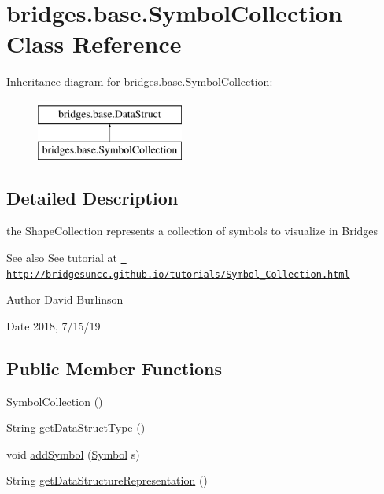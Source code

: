 \hypertarget{classbridges_1_1base_1_1_symbol_collection}{}\section{bridges.\+base.\+Symbol\+Collection Class Reference}
\label{classbridges_1_1base_1_1_symbol_collection}
Inheritance diagram for bridges.\+base.\+Symbol\+Collection\+:\begin{figure}[H]
\begin{center}
\leavevmode
\includegraphics[height=2.000000cm]{classbridges_1_1base_1_1_symbol_collection}
\end{center}
\end{figure}


\subsection{Detailed Description}
the Shape\+Collection represents a collection of symbols to visualize in Bridges 

\begin{DoxySeeAlso}{See also}
See tutorial at \href{http://bridgesuncc.github.io/tutorials/Symbol_Collection.html}{\texttt{ http\+://bridgesuncc.\+github.\+io/tutorials/\+Symbol\+\_\+\+Collection.\+html}}
\end{DoxySeeAlso}
\begin{DoxyAuthor}{Author}
David Burlinson 
\end{DoxyAuthor}
\begin{DoxyDate}{Date}
2018, 7/15/19 
\end{DoxyDate}
\subsection*{Public Member Functions}
\begin{DoxyCompactItemize}
\item 
\mbox{\hyperlink{classbridges_1_1base_1_1_symbol_collection_a8959dab963ce54f56560c6c27a3a3de5}{Symbol\+Collection}} ()
\item 
String \mbox{\hyperlink{classbridges_1_1base_1_1_symbol_collection_afbc928d2e6818edec96d10f52feebacb}{get\+Data\+Struct\+Type}} ()
\item 
void \mbox{\hyperlink{classbridges_1_1base_1_1_symbol_collection_a8e934c53b78b05a7e982f3ff2362adea}{add\+Symbol}} (\mbox{\hyperlink{classbridges_1_1base_1_1_symbol}{Symbol}} s)
\item 
String \mbox{\hyperlink{classbridges_1_1base_1_1_symbol_collection_a706ad8a7bcf12c194403ac3281c73674}{get\+Data\+Structure\+Representation}} ()
\end{DoxyCompactItemize}
